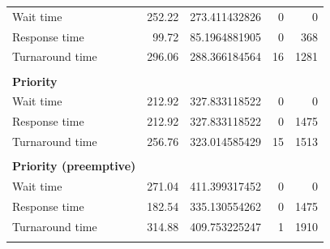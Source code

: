 \documentclass[12pt,letterpaper]{article}
\begin{document}
\begin{appendices}
\begin{table}[H]
\begin{tabular}{l r r r r}
					\hline
Wait time &		252.22 &	273.411432826 &	0 &	0 	\\
Response time &		99.72 &	85.1964881905 &	0 &	368 	\\
Turnaround time &	296.06 &	288.366184564 &	16 &	1281 	\\
					\\
					\textbf{Priority} \\
					\hline
Wait time &		212.92 &	327.833118522 &	0 &	0 	\\
Response time &		212.92 &	327.833118522 &	0 &	1475 	\\
Turnaround time &	256.76 &	323.014585429 &	15 &	1513 	\\
					\\
					\textbf{Priority (preemptive)} \\
					\hline
Wait time &		271.04 &	411.399317452 &	0 &	0 	\\
Response time &		182.54 &	335.130554262 &	0 &	1475 	\\
Turnaround time &	314.88 &	409.753225247 &	1 &	1910 	\\
					\\
				\end{tabular}
			\end{table}


\end{appendices}
\end{document}

